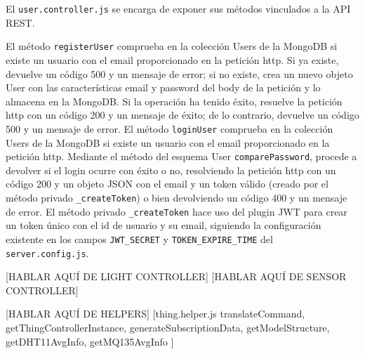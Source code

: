 \vspace{1cm}

El \verb|user.controller.js| se encarga de exponer sus métodos vinculados a la API REST.

\vspace{0.5cm}

El método \verb|registerUser| comprueba en la colección Users de la MongoDB si existe un usuario con el email proporcionado en la petición http. Si ya existe, devuelve un código 500 y un mensaje de error; si no existe, crea un nuevo objeto User con las características email y password del body de la petición y lo almacena en la MongoDB. Si la operación ha tenido éxito, resuelve la petición http con un código 200 y un mensaje de éxito; de lo contrario, devuelve un código 500 y un mensaje de error.
El método \verb|loginUser| comprueba en la colección Users de la MongoDB si existe un usuario con el email proporcionado en la petición http. Mediante el método del esquema User \verb|comparePassword|, procede a devolver si el login ocurre con éxito o no, resolviendo la petición http con un código 200 y un objeto JSON con el email y un token válido (creado por el método privado \verb|_createToken|) o bien devolviendo un código 400 y un mensaje de error.
El método privado \verb|_createToken| hace uso del plugin JWT para crear un token único con el id de usuario y su email, siguiendo la configuración existente en los campos \verb|JWT_SECRET| y \verb|TOKEN_EXPIRE_TIME| del \verb|server.config.js|.

[HABLAR AQUÍ DE LIGHT CONTROLLER]
[HABLAR AQUÍ DE SENSOR CONTROLLER]

[HABLAR AQUÍ DE HELPERS]
[thing.helper.js
  translateCommand,
  getThingControllerInstance,
  generateSubscriptionData,
  getModelStructure,
  getDHT11AvgInfo,
  getMQ135AvgInfo
]

